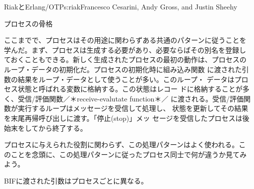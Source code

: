 \begin{aosachapter}{RiakとErlang/OTP}{s:riak}{Francesco Cesarini, Andy Gross, and Justin Sheehy}
\begin{aosasect1}{プロセスの骨格}

ここまでで、プロセスはその用途に関わらずある共通のパターンに従うことを
学んだ。まず、プロセスは生成する必要があり、必要ならばその別名を登録し
ておくこともできる。新しく生成されたプロセスの最初の動作は、プロセスの
ループ・データの初期化だ。プロセスの初期化時に組み込み関数
に渡された引数の結果をループ・データとして使うことが多い。このループ・
データはプロセス状態と呼ばれる変数に格納する。この状態はレコー
ドに格納することが多く、受信/評価関数／＊receive-evalutate function＊／
に渡される。受信/評価関数が実行するループはメッセージを受信して処理し、
状態を更新してその結果を末尾再帰呼び出しに渡す。「停止(stop)」メッ
セージを受信したプロセスは後始末をしてから終了する。


プロセスに与えられた役割に関わらず、この処理パターンはよく使われる。こ
のことを念頭に、この処理パターンに従ったプロセス同士で何が違うか見てみ
よう。

\begin{aosaitemize}


  \item {} BIFに渡された引数はプロセスごとに異なる。



\end{aosaitemize}
\end{aosasect1}
\end{aosachapter}
